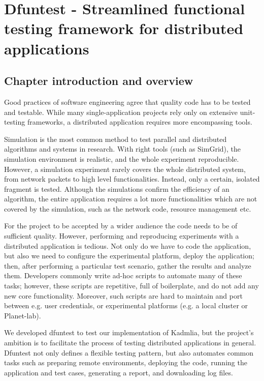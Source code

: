 \chapter{Dfuntest - Streamlined functional testing framework for distributed applications}
\label{ch:dfuntest}
\section{Chapter introduction and overview}
Good practices of software engineering agree \cite{mccon04} that quality code has to be tested and testable.
While many single-application projects rely only on extensive unit-testing frameworks, a distributed application requires more encompassing tools.

Simulation is the most common method to test parallel and distributed algorithms and systems in research.
With right tools (such as SimGrid\cite{cas08}), the simulation environment is realistic, and the whole experiment reproducible.
However, a simulation experiment rarely covers the whole distributed system, from network packets to high level functionalities.
Instead, only a certain, isolated fragment is tested.
Although the simulations confirm the efficiency of an algorithm, the entire application requires a lot more functionalities which are not covered by the simulation, such as the network code, resource management etc.

For the project to be accepted by a wider audience the code needs to be of sufficient quality.
However, performing and reproducing experiments with a distributed application is tedious.
Not only do we have to code the application, but also we need to configure the experimental platform, deploy the application; then, after performing a particular test scenario, gather the results and analyze them.
Developers commonly write ad-hoc scripts to automate many of these tasks; however, these scripts are repetitive, full of boilerplate, and do not add any new core functionality.
Moreover, such scripts are hard to maintain and port between e.g. user credentials, or experimental platforms (e.g. a local cluster or Planet-lab).

We developed dfuntest to test our implementation of Kadmlia, but the project's ambition is to facilitate the process of testing distributed applications in general. 
Dfuntest not only defines a flexible testing pattern, but also automates common tasks such as preparing remote environments, deploying the code, running the application and test cases, generating a report, and downloading log files.

